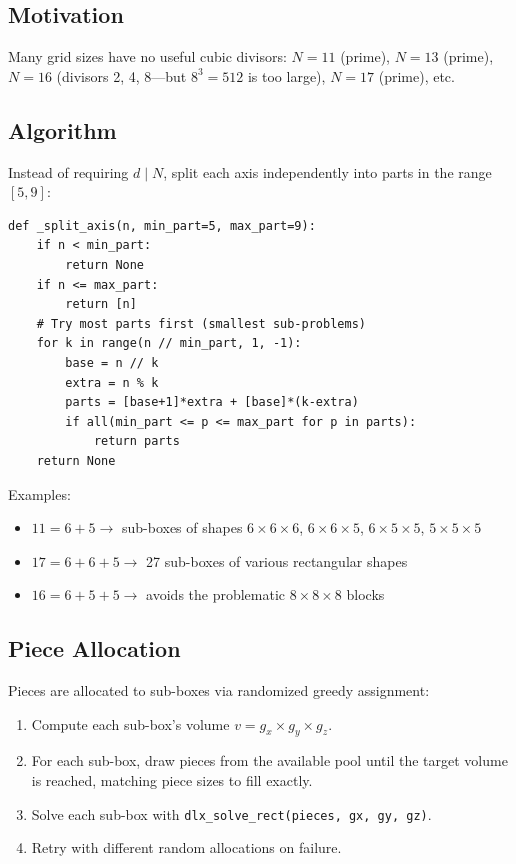 \documentclass[11pt]{article}
\begin{document}
\subsection{Motivation}

Many grid sizes have no useful cubic divisors: $N=11$ (prime), $N=13$ (prime), $N=16$ (divisors 2, 4, 8---but $8^3=512$ is too large), $N=17$ (prime), etc.

\subsection{Algorithm}

Instead of requiring $d \mid N$, split each axis independently into parts in the range $[5, 9]$:

\begin{lstlisting}
def _split_axis(n, min_part=5, max_part=9):
    if n < min_part:
        return None
    if n <= max_part:
        return [n]
    # Try most parts first (smallest sub-problems)
    for k in range(n // min_part, 1, -1):
        base = n // k
        extra = n % k
        parts = [base+1]*extra + [base]*(k-extra)
        if all(min_part <= p <= max_part for p in parts):
            return parts
    return None
\end{lstlisting}

Examples:
\begin{itemize}[nosep]
  \item $11 = 6 + 5 \to$ sub-boxes of shapes $6{\times}6{\times}6$, $6{\times}6{\times}5$, $6{\times}5{\times}5$, $5{\times}5{\times}5$
  \item $17 = 6 + 6 + 5 \to$ 27 sub-boxes of various rectangular shapes
  \item $16 = 6 + 5 + 5 \to$ avoids the problematic $8{\times}8{\times}8$ blocks
\end{itemize}

\subsection{Piece Allocation}

Pieces are allocated to sub-boxes via randomized greedy assignment:
\begin{enumerate}[nosep]
  \item Compute each sub-box's volume $v = g_x \times g_y \times g_z$.
  \item For each sub-box, draw pieces from the available pool until the target volume is reached, matching piece sizes to fill exactly.
  \item Solve each sub-box with \texttt{dlx\_solve\_rect(pieces, gx, gy, gz)}.
  \item Retry with different random allocations on failure.
\end{enumerate}
\end{document}
